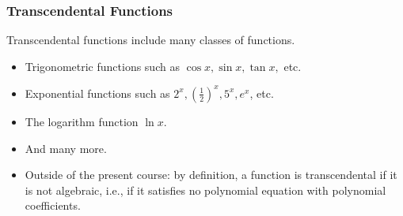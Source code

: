 \begin{frame}
\frametitle{Transcendental Functions}
Transcendental functions include many classes of functions.
\begin{itemize}
\item<2->  Trigonometric functions such as $\cos x, \sin x, \tan x,$ etc.
\item<3->  Exponential functions such as $2^x, \left( \frac{1}{2}\right)^x, 5^x, e^x$, etc.
\item<4->  The logarithm function $\ln x$.
\item<5->  And many more.
\item<6-> Outside of the present course: by definition, a function is transcendental if it is not algebraic, i.e., if it satisfies no polynomial equation with polynomial coefficients.
\end{itemize}
\end{frame}
